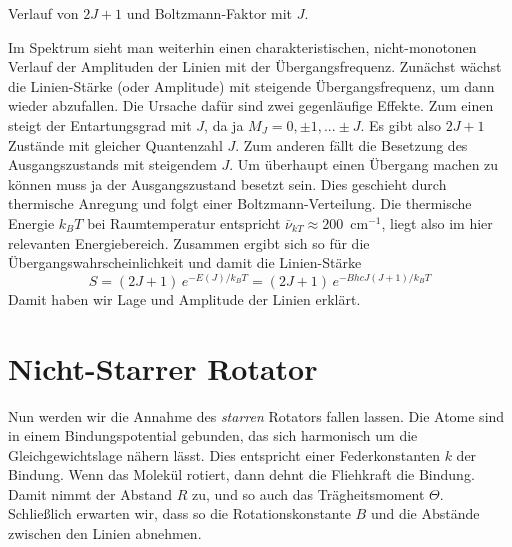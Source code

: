 \begin{marginfigure}
\caption{Verlauf von $2J +1$ und Boltzmann-Faktor mit $J$.}
\end{marginfigure}


Im Spektrum sieht man weiterhin einen charakteristischen, nicht-monotonen Verlauf der Amplituden der Linien mit der Übergangsfrequenz. Zunächst wächst die Linien-Stärke (oder Amplitude) mit steigende Übergangsfrequenz, um dann wieder abzufallen. Die Ursache dafür sind zwei gegenläufige Effekte. Zum einen steigt der Entartungsgrad mit $J$, da ja $M_J = 0, \pm 1, ... \pm J$. Es gibt also $2J+1$ Zustände mit gleicher Quantenzahl $J$.
Zum anderen fällt die Besetzung des Ausgangszustands mit steigendem $J$. Um überhaupt einen Übergang machen zu können muss ja der Ausgangszustand besetzt sein. Dies geschieht durch thermische Anregung und folgt einer Boltzmann-Verteilung. Die thermische Energie $k_B T$ bei Raumtemperatur entspricht  $\bar{\nu}_{k T} \approx 200$~cm$^{-1}$, liegt also im hier relevanten Energiebereich. Zusammen ergibt sich so für die Übergangswahrscheinlichkeit und damit die Linien-Stärke
\begin{equation}
 S= (2J+1) \, e^{- E(J) / k_B T} = (2J+1) \, e^{- B hc J (J+1) / k_B T} 
\end{equation}
Damit haben wir Lage und Amplitude der Linien erklärt.


\section{Nicht-Starrer Rotator}

Nun werden wir die Annahme des \emph{starren} Rotators fallen lassen. Die Atome sind in einem Bindungspotential gebunden, das sich harmonisch um die Gleichgewichtslage nähern lässt. Dies entspricht einer Federkonstanten $k$ der Bindung. Wenn das Molekül rotiert, dann dehnt die Fliehkraft die Bindung. Damit nimmt der Abstand $R$ zu, und so auch das Trägheitsmoment $\Theta$. Schließlich erwarten wir, dass so die Rotationskonstante $B$ und die Abstände zwischen den Linien abnehmen.

